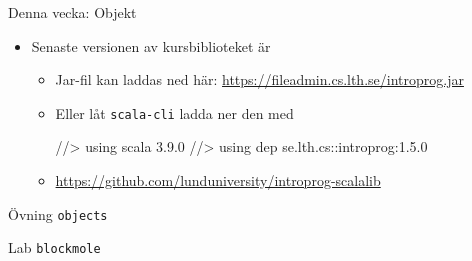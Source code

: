\begin{SlideExtra}{Denna vecka: Objekt}
\begin{itemize}
\item Senaste versionen av kursbiblioteket  är \Emph{\LibVersion} 
\begin{itemize}\SlideFontTiny
\item Jar-fil kan laddas ned här: \url{https://fileadmin.cs.lth.se/introprog.jar}
\item Eller låt \texttt{scala-cli} ladda ner den med
\begin{Code}
//> using scala 3.9.0
//> using dep se.lth.cs::introprog:1.5.0  
\end{Code} 
\item \url{https://github.com/lunduniversity/introprog-scalalib}
\end{itemize}
\end{itemize}
\end{SlideExtra}


\begin{SlideExtra}{Övning \texttt{objects}}\SlideFontTiny
\setlength{\leftmargini}{0pt}
\begin{itemize}

\end{itemize}
\end{SlideExtra}

\begin{SlideExtra}{Lab \texttt{blockmole}}\SlideFontTiny
\begin{itemize}

\end{itemize}

\end{SlideExtra}
\fi

